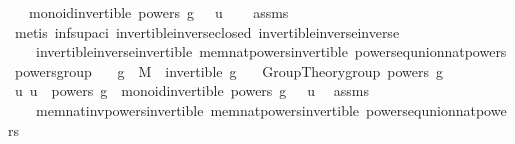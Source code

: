 \begin{isabellebody}
\ \ \ {\isachardoublequoteopen}monoid{\isachardot}{\kern0pt}invertible\ {\isacharparenleft}{\kern0pt}powers\ g{\isacharparenright}{\kern0pt}\ {\isacharparenleft}{\kern0pt}{\isasymcdot}{\isacharparenright}{\kern0pt}\ {\isasymone}\ u{\isachardoublequoteclose}\isanewline
%
\isadelimproof
\ \ %
\endisadelimproof
%
\isatagproof
{}\isamarkupfalse%
\ assms\ \isamarkupfalse%
\ {\isacharparenleft}{\kern0pt}metis\ inf{\isacharunderscore}{\kern0pt}sup{\isacharunderscore}{\kern0pt}aci{\isacharparenleft}{\kern0pt}{}{\isacharparenright}{\kern0pt}\ invertible{\isacharunderscore}{\kern0pt}inverse{\isacharunderscore}{\kern0pt}closed\ invertible{\isacharunderscore}{\kern0pt}inverse{\isacharunderscore}{\kern0pt}inverse\ \isanewline
\ \ \ \ invertible{\isacharunderscore}{\kern0pt}inverse{\isacharunderscore}{\kern0pt}invertible\ mem{\isacharunderscore}{\kern0pt}nat{\isacharunderscore}{\kern0pt}powers{\isacharunderscore}{\kern0pt}invertible\ powers{\isacharunderscore}{\kern0pt}eq{\isacharunderscore}{\kern0pt}union{\isacharunderscore}{\kern0pt}nat{\isacharunderscore}{\kern0pt}powers{\isacharparenright}{\kern0pt}%
\endisatagproof
{\isafoldproof}%
%
\isadelimproof
\isanewline
%
\endisadelimproof
\isanewline
{}\isamarkupfalse%
\ powers{\isacharunderscore}{\kern0pt}group{\isacharcolon}{\kern0pt}\isanewline
\ \ \ {\isachardoublequoteopen}g\ {\isasymin}\ M{\isachardoublequoteclose}\ \ {\isachardoublequoteopen}invertible\ g{\isachardoublequoteclose}\isanewline
\ \ \ {\isachardoublequoteopen}Group{\isacharunderscore}{\kern0pt}Theory{\isachardot}{\kern0pt}group\ {\isacharparenleft}{\kern0pt}powers\ g{\isacharparenright}{\kern0pt}\ {\isacharparenleft}{\kern0pt}{\isasymcdot}{\isacharparenright}{\kern0pt}\ {\isasymone}{\isachardoublequoteclose}\isanewline
%
\isadelimproof
%
\endisadelimproof
%
\isatagproof
{}\isamarkupfalse%
{\isacharminus}{\kern0pt}\isanewline
\ \ \isamarkupfalse%
\ {\isachardoublequoteopen}{\isasymAnd}u{\isachardot}{\kern0pt}\ u\ {\isasymin}\ powers\ g\ {\isasymLongrightarrow}\ monoid{\isachardot}{\kern0pt}invertible\ {\isacharparenleft}{\kern0pt}powers\ g{\isacharparenright}{\kern0pt}\ {\isacharparenleft}{\kern0pt}{\isasymcdot}{\isacharparenright}{\kern0pt}\ {\isasymone}\ u{\isachardoublequoteclose}\ \isamarkupfalse%
\ assms\ \isanewline
\ \ \ \ mem{\isacharunderscore}{\kern0pt}nat{\isacharunderscore}{\kern0pt}inv{\isacharunderscore}{\kern0pt}powers{\isacharunderscore}{\kern0pt}invertible\ mem{\isacharunderscore}{\kern0pt}nat{\isacharunderscore}{\kern0pt}powers{\isacharunderscore}{\kern0pt}invertible\ powers{\isacharunderscore}{\kern0pt}eq{\isacharunderscore}{\kern0pt}union{\isacharunderscore}{\kern0pt}nat{\isacharunderscore}{\kern0pt}powers\ \isamarkupfalse%

\end{isabellebody}
